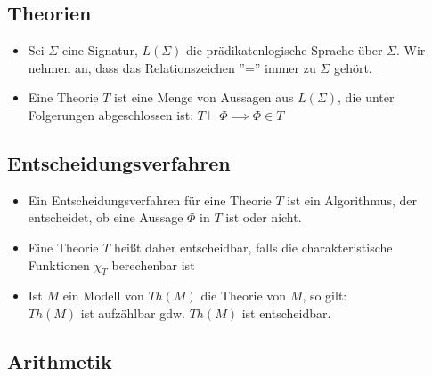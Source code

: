 \documentclass{scrartcl}
\begin{document}
\subsection{Theorien}

\begin{itemize}
	\item Sei $ \Sigma $ eine Signatur, $ L(\Sigma) $ die prädikatenlogische Sprache über $ \Sigma $. Wir nehmen an, dass das Relationszeichen ''='' immer zu $ \Sigma $ gehört.
	\item Eine Theorie $ T $ ist eine Menge von Aussagen aus $ L(\Sigma) $, die unter Folgerungen abgeschlossen ist: $ T \vdash \Phi \implies \Phi \in T $
\end{itemize}

\subsection{Entscheidungsverfahren}

\begin{itemize}
	\item Ein Entscheidungsverfahren für eine Theorie $ T $ ist ein Algorithmus, der entscheidet, ob eine Aussage $ \Phi $ in $ T $ ist oder nicht.
	\item Eine Theorie $ T $ heißt daher entscheidbar, falls die charakteristische Funktionen $ \chi_T $ berechenbar ist
	\item Ist $ M $ ein Modell von $ Th(M) $ die Theorie von $ M $, so gilt: \\
	$ Th(M) $ ist aufzählbar gdw. $ Th(M) $ ist entscheidbar.
\end{itemize}

\subsection{Arithmetik}
\end{document}
